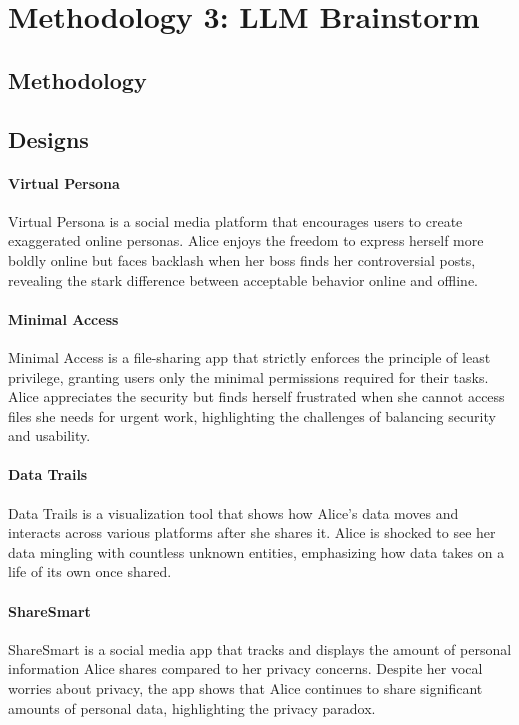 \section{Methodology 3: LLM Brainstorm}

\subsection{Methodology}

\subsection{Designs}

\paragraph{Virtual Persona} 
Virtual Persona is a social media platform that encourages users to create exaggerated online personas. Alice enjoys the freedom to express herself more boldly online but faces backlash when her boss finds her controversial posts, revealing the stark difference between acceptable behavior online and offline.

\paragraph{Minimal Access}
Minimal Access is a file-sharing app that strictly enforces the principle of least privilege, granting users only the minimal permissions required for their tasks. Alice appreciates the security but finds herself frustrated when she cannot access files she needs for urgent work, highlighting the challenges of balancing security and usability.

\paragraph{Data Trails}
Data Trails is a visualization tool that shows how Alice's data moves and interacts across various platforms after she shares it. Alice is shocked to see her data mingling with countless unknown entities, emphasizing how data takes on a life of its own once shared.

\paragraph{ShareSmart}
ShareSmart is a social media app that tracks and displays the amount of personal information Alice shares compared to her privacy concerns. Despite her vocal worries about privacy, the app shows that Alice continues to share significant amounts of personal data, highlighting the privacy paradox.

